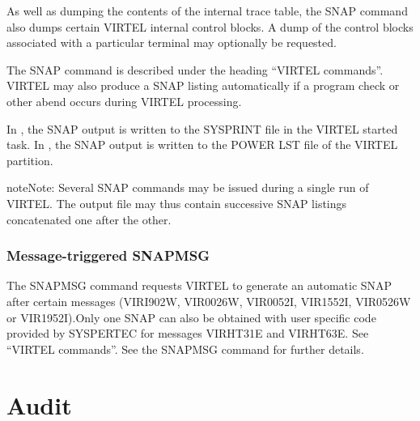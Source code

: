 \documentclass[letterpaper,10pt,english]{sphinxmanual}
\begin{document}
As well as dumping the contents of the internal trace table, the SNAP command also dumps certain VIRTEL internal control blocks. A dump of the control blocks associated with a particular terminal may optionally be requested.

The SNAP command is described under the heading “VIRTEL commands”. VIRTEL may also produce a SNAP listing automatically if a program check or other abend occurs during VIRTEL processing.

In , the SNAP output is written to the SYSPRINT file in the VIRTEL started task.
In , the SNAP output is written to the POWER LST file of the VIRTEL partition.

\begin{sphinxadmonition}{note}{Note:}
Several SNAP commands may be issued during a single run of VIRTEL. The output file may thus contain successive SNAP listings concatenated one after the other.
\end{sphinxadmonition}



\ignorespaces 

\subsection{Message-triggered SNAPMSG}
\label{\detokenize{audit_operations_ and_performance:message-triggered-snapmsg}}\label{\detokenize{audit_operations_ and_performance:index-81}}
The SNAPMSG command requests VIRTEL to generate an automatic SNAP after certain messages (VIRI902W, VIR0026W, VIR0052I, VIR1552I, VIR0526W or VIR1952I).Only one SNAP can also be obtained with user specific code provided by SYSPERTEC for messages VIRHT31E and VIRHT63E. See “VIRTEL commands”. See the SNAPMSG command for further details.

\ignorespaces 

\chapter{Audit}
\label{\detokenize{audit_operations_ and_performance:audit}}\label{\detokenize{audit_operations_ and_performance:index-82}}
\ignorespaces 
\end{document}

